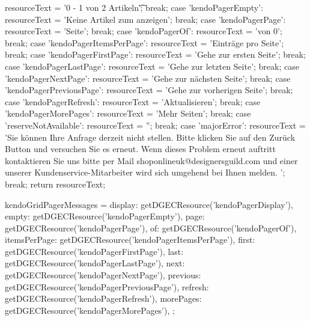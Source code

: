{{                        resourceText = '{0} - {1} von {2} Artikeln\t';
                        break;
                    case 'kendoPagerEmpty':
                        resourceText = 'Keine Artikel zum anzeigen';
                        break;
                    case 'kendoPagerPage':
                        resourceText = 'Seite';
                        break;
                    case 'kendoPagerOf':
                        resourceText = 'von {0}';
                        break;
                    case 'kendoPagerItemsPerPage':
                        resourceText = 'Einträge pro Seite';
                        break;
                    case 'kendoPagerFirstPage':
                        resourceText = 'Gehe zur ersten Seite';
                        break;
                    case 'kendoPagerLastPage':
                        resourceText = 'Gehe zur letzten Seite';
                        break;
                    case 'kendoPagerNextPage':
                        resourceText = 'Gehe zur nächsten Seite';
                        break;
                    case 'kendoPagerPreviousPage':
                        resourceText = 'Gehe zur vorherigen Seite';
                        break;
                    case 'kendoPagerRefresh':
                        resourceText = 'Aktualisieren';
                        break;
                    case 'kendoPagerMorePages':
                        resourceText = 'Mehr Seiten';
                        break;
                    case 'reserveNotAvailable':
                        resourceText = '';
                        break;
                    case 'majorError':
                        resourceText = 'Sie können Ihre Anfrage derzeit nicht stellen. Bitte klicken Sie auf den Zurück Button und versuchen Sie es erneut. Wenn dieses Problem erneut auftritt kontaktieren Sie uns bitte per Mail shoponlineuk@designersguild.com und einer unserer Kundenservice-Mitarbeiter wird sich umgehend bei Ihnen melden. ';
                        break;
                }
                return resourceText;
            }

            kendoGridPagerMessages = {
                display: getDGECResource('kendoPagerDisplay'),
                empty: getDGECResource('kendoPagerEmpty'),
                page: getDGECResource('kendoPagerPage'),
                of: getDGECResource('kendoPagerOf'),
                itemsPerPage: getDGECResource('kendoPagerItemsPerPage'),
                first: getDGECResource('kendoPagerFirstPage'),
                last: getDGECResource('kendoPagerLastPage'),
                next: getDGECResource('kendoPagerNextPage'),
                previous: getDGECResource('kendoPagerPreviousPage'),
                refresh: getDGECResource('kendoPagerRefresh'),
                morePages: getDGECResource('kendoPagerMorePages'),
            };

